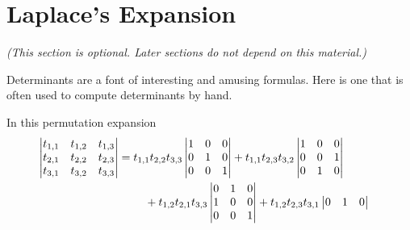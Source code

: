 \section{Laplace's Expansion}
\textit{(This section is optional.
  Later sections do not depend on this material.)}

Determinants are a font of interesting and amusing formulas.
Here is one that is often used
to compute determinants by hand.




\begin{example}  \label{ex:ExpThreeFirstRow}
In this permutation expansion
\begin{align*}
  \begin{vmatrix}
              t_{1,1}  &t_{1,2}  &t_{1,3}  \\
              t_{2,1}  &t_{2,2}  &t_{2,3}  \\
              t_{3,1}  &t_{3,2}  &t_{3,3}
           \end{vmatrix}             
  &=\begin{aligned}[t]
     &t_{1,1}t_{2,2}t_{3,3}\begin{vmatrix}
                             1  &0  &0  \\
                             0  &1  &0  \\
                             0  &0  &1
                           \end{vmatrix}
      +t_{1,1}t_{2,3}t_{3,2}\begin{vmatrix}
                              1  &0  &0  \\
                              0  &0  &1  \\
                              0  &1  &0
                            \end{vmatrix}           \\
      &\hbox{}\quad\hbox{}
         +t_{1,2}t_{2,1}t_{3,3}\begin{vmatrix}
                                 0  &1  &0  \\
                                 1  &0  &0  \\
                                 0  &0  &1
                                \end{vmatrix}
         +t_{1,2}t_{2,3}t_{3,1}\begin{vmatrix}
                                 0  &1  &0  \\

\end{vmatrix}
\end{aligned}
\end{align*}
\end{example}

